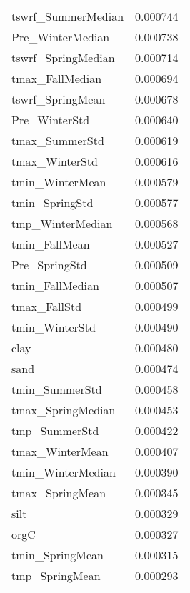 \begin{tabular}{lr}
tswrf_SummerMedian & 0.000744 \\
Pre_WinterMedian & 0.000738 \\
tswrf_SpringMedian & 0.000714 \\
tmax_FallMedian & 0.000694 \\
tswrf_SpringMean & 0.000678 \\
Pre_WinterStd & 0.000640 \\
tmax_SummerStd & 0.000619 \\
tmax_WinterStd & 0.000616 \\
tmin_WinterMean & 0.000579 \\
tmin_SpringStd & 0.000577 \\
tmp_WinterMedian & 0.000568 \\
tmin_FallMean & 0.000527 \\
Pre_SpringStd & 0.000509 \\
tmin_FallMedian & 0.000507 \\
tmax_FallStd & 0.000499 \\
tmin_WinterStd & 0.000490 \\
clay & 0.000480 \\
sand & 0.000474 \\
tmin_SummerStd & 0.000458 \\
tmax_SpringMedian & 0.000453 \\
tmp_SummerStd & 0.000422 \\
tmax_WinterMean & 0.000407 \\
tmin_WinterMedian & 0.000390 \\
tmax_SpringMean & 0.000345 \\
silt & 0.000329 \\
orgC & 0.000327 \\
tmin_SpringMean & 0.000315 \\
tmp_SpringMean & 0.000293 \\
\bottomrule
\end{tabular}
